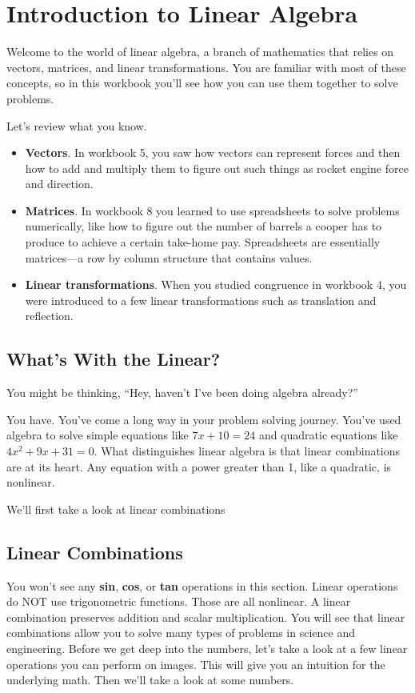 \chapter{Introduction to Linear Algebra}

Welcome to the world of linear algebra, a branch of mathematics that relies on vectors, matrices, and linear transformations. You are familiar with most of these concepts, so in this workbook you’ll see how you can use them together to solve problems.  

Let’s review what you know.

\begin{itemize}
\item \textbf{Vectors}. In workbook 5, you saw how vectors can represent forces and then how to add and multiply them to figure out such things as rocket engine force and direction. 
\item \textbf{Matrices}. In workbook 8 you learned to use spreadsheets to solve problems numerically, like how to figure out the number of barrels a cooper has to produce to achieve a certain take-home pay. Spreadsheets are essentially matrices—a row by column structure that contains values. 
\item \textbf{Linear transformations}. When you studied congruence in workbook 4, you were introduced to a few linear transformations such as translation and reflection. 
\end{itemize}

\section{What's With the Linear?}

You might be thinking, “Hey, haven’t I’ve been doing algebra already?” 

You have. You've come a long way in your problem solving journey. You've used algebra to solve simple equations like $7x + 10 = 24$ and quadratic equations like $4x^{2} + 9x + 31 = 0$. What distinguishes linear algebra is that linear combinations are at its heart. Any equation with a power greater than 1, like a quadratic, is nonlinear.

We’ll first take a look at linear combinations

\section{Linear Combinations}

You won’t see any \textbf{sin}, \textbf{cos}, or \textbf{tan} operations in this section. Linear operations do NOT use trigonometric functions. Those are all nonlinear. A linear combination  preserves addition and scalar multiplication. You will see that linear combinations allow you to solve many types of problems in science and engineering. Before we get deep into the numbers, let’s take a look at a few linear operations you can perform on images. This will give you an intuition for the underlying math. Then we’ll take a look at some numbers.

